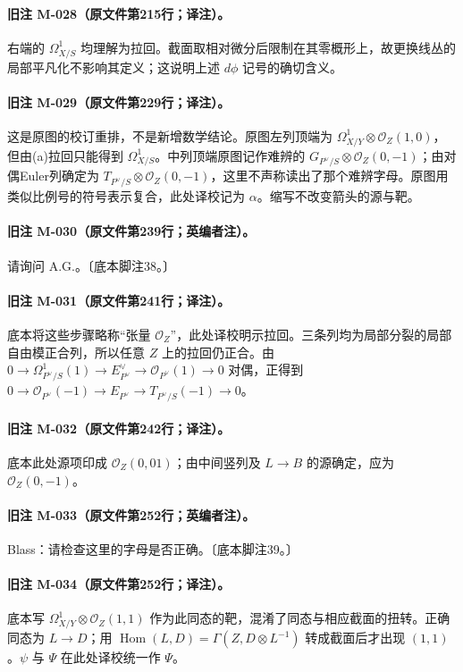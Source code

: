 \documentclass[UTF8,a4paper]{ctexbook}
\begin{document}
\paragraph{旧注 M-028（原文件第215行；译注）。}
右端的 $\Omega^1_{X/S}$ 均理解为拉回。截面取相对微分后限制在其零概形上，故更换线丛的局部平凡化不影响其定义；这说明上述 $d\phi$ 记号的确切含义。

\paragraph{旧注 M-029（原文件第229行；译注）。}
这是原图的校订重排，不是新增数学结论。原图左列顶端为 $\Omega^1_{X/Y}\otimes\mathcal O_Z(1,0)$，但由(a)拉回只能得到 $\Omega^1_{X/S}$。中列顶端原图记作难辨的 $G_{P^\vee/S}\otimes\mathcal O_Z(0,-1)$；由对偶Euler列确定为 $T_{P^\vee/S}\otimes\mathcal O_Z(0,-1)$，这里不声称读出了那个难辨字母。原图用类似比例号的符号表示复合，此处译校记为 $\alpha$。缩写不改变箭头的源与靶。

\paragraph{旧注 M-030（原文件第239行；英编者注）。}
请询问 A.G.。〔底本脚注38。〕

\paragraph{旧注 M-031（原文件第241行；译注）。}
底本将这些步骤略称“张量 $\mathcal O_Z$”，此处译校明示拉回。三条列均为局部分裂的局部自由模正合列，所以任意 $Z$ 上的拉回仍正合。由 $0\to\Omega^1_{P^\vee/S}(1)\to E^\vee_{P^\vee}\to\mathcal O_{P^\vee}(1)\to0$ 对偶，正得到 $0\to\mathcal O_{P^\vee}(-1)\to E_{P^\vee}\to T_{P^\vee/S}(-1)\to0$。

\paragraph{旧注 M-032（原文件第242行；译注）。}
底本此处源项印成 $\mathcal O_Z(0,01)$；由中间竖列及 $L\to B$ 的源确定，应为 $\mathcal O_Z(0,-1)$。

\paragraph{旧注 M-033（原文件第252行；英编者注）。}
Blass：请检查这里的字母是否正确。〔底本脚注39。〕

\paragraph{旧注 M-034（原文件第252行；译注）。}
底本写 $\Omega^1_{X/Y}\otimes\mathcal O_Z(1,1)$ 作为此同态的靶，混淆了同态与相应截面的扭转。正确同态为 $L\to D$；用 $\operatorname{Hom}(L,D)=\Gamma(Z,D\otimes L^{-1})$ 转成截面后才出现 $(1,1)$。$\psi$ 与 $\Psi$ 在此处译校统一作 $\Psi$。
\end{document}
